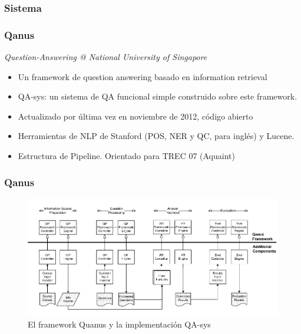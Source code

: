 \subsubsection*{Sistema}

\begin{frame}
\frametitle{Qanus}
  \textit{Question-Answering @ National University of Singapore}
  \begin{itemize}
    \item Un framework de question answering basado en information retrieval
    \item QA-sys: un sistema de QA funcional simple construido sobre este framework. 
    \item Actualizado por última vez en noviembre de 2012, código abierto
    \item Herramientas de NLP de Stanford (POS, NER y QC, para inglés) y Lucene. 
    \item Estructura de Pipeline. Orientado para TREC 07 (Aquaint)
  \end{itemize}
\end{frame}

\begin{frame}
\frametitle{Qanus}
  \begin{figure}
      \includegraphics[scale=0.7]{graficos/Quanus}
    \caption{El framework Quanus y la implementación QA-sys}
    \label{fig:Quanus}
  \end{figure}
\end{frame}

